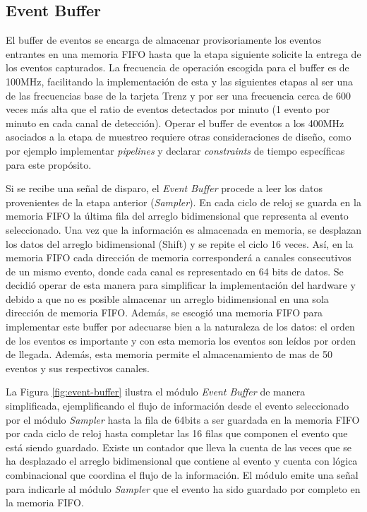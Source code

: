 	
	\subsection{Event Buffer}
	\label{sec:buffer}
	
	El buffer de eventos se encarga de almacenar provisoriamente los eventos entrantes en una memoria FIFO hasta que la etapa siguiente solicite la entrega de los eventos capturados. La frecuencia de operación escogida para el buffer es de 100MHz, facilitando la implementación de esta y las siguientes etapas al ser una de las frecuencias base de la tarjeta Trenz y por ser una frecuencia cerca de 600 veces más alta que el ratio de eventos detectados por minuto (1 evento por minuto en cada canal de detección). Operar el buffer de eventos a los 400MHz asociados a la etapa de muestreo requiere otras consideraciones de diseño, como por ejemplo implementar \textit{pipelines} y declarar \textit{constraints} de tiempo específicas para este propósito\cite{XilinxFIFOSuite}. 
	
	Si se recibe una señal de disparo, el \textit{Event Buffer} procede a leer los datos provenientes de la etapa anterior (\textit{Sampler}). En cada ciclo de reloj se guarda en la memoria FIFO la última fila del arreglo bidimensional que representa al evento seleccionado. Una vez que la información es almacenada en memoria, se desplazan los datos del arreglo bidimensional (Shift) y se repite el ciclo 16 veces. Así, en la memoria FIFO cada dirección de memoria corresponderá a canales consecutivos de un mismo evento, donde cada canal es representado en 64 bits de datos. Se decidió operar de esta manera para simplificar la implementación del hardware y debido a que no es posible almacenar un arreglo bidimensional en una sola dirección de memoria FIFO. Además, se escogió una memoria FIFO para implementar este buffer por adecuarse bien a la naturaleza de los datos: el orden de los eventos es importante y con esta memoria los eventos son leídos por orden de llegada. Además, esta memoria permite el almacenamiento de mas de 50 eventos y sus respectivos canales.
	
	La Figura \ref{fig:event-buffer} ilustra el módulo \textit{Event Buffer} de manera simplificada, ejemplificando el flujo de información desde el evento seleccionado por el módulo \textit{Sampler} hasta la fila de 64bits a ser guardada en la memoria FIFO por cada ciclo de reloj hasta completar las 16 filas que componen el evento que está siendo guardado. Existe un contador que lleva la cuenta de las veces que se ha desplazado el arreglo bidimensional que contiene al evento y cuenta con lógica combinacional que coordina el flujo de la información. El módulo emite una señal para indicarle al módulo \textit{Sampler} que el evento ha sido guardado por completo en la memoria FIFO.
	
